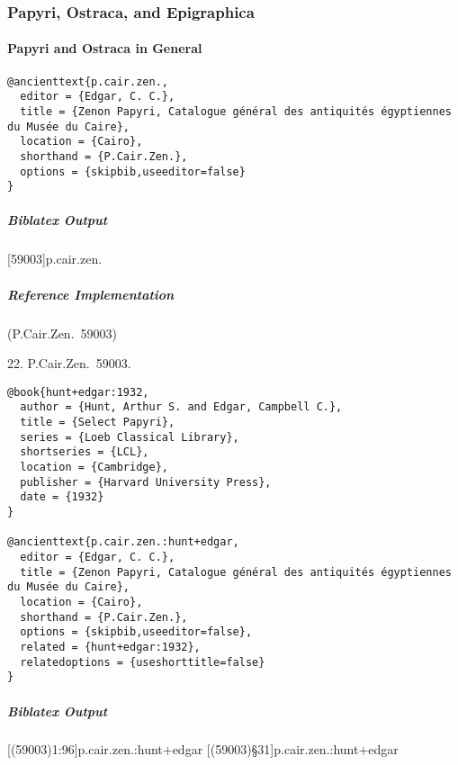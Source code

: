 \documentclass[a4paper]{article}
\newenvironment{biboutput}{%
  \subparagraph{Biblatex Output}
}{\color{black}}
\newenvironment{refimp}{%
  \subparagraph{Reference Implementation}
  \color{reference-colour}
  \rm
}{\par\color{black}}
\begin{document}
\subsubsection{Papyri, Ostraca, and Epigraphica}

\paragraph{Papyri and Ostraca in General}

\begin{lstlisting}
@ancienttext{p.cair.zen.,
  editor = {Edgar, C. C.},
  title = {Zenon Papyri, Catalogue général des antiquités égyptiennes du Musée du Caire},
  location = {Cairo},
  shorthand = {P.Cair.Zen.},
  options = {skipbib,useeditor=false}
}
\end{lstlisting}

\begin{biboutput}
  [59003]{p.cair.zen.}
\end{biboutput}

\begin{refimp}
  (P.Cair.Zen.\ 59003)

  \hspace*{\bibindent}22. P.Cair.Zen.\ 59003.
\end{refimp}

\medskip

\begin{lstlisting}
@book{hunt+edgar:1932,
  author = {Hunt, Arthur S. and Edgar, Campbell C.},
  title = {Select Papyri},
  series = {Loeb Classical Library},
  shortseries = {LCL},
  location = {Cambridge},
  publisher = {Harvard University Press},
  date = {1932}
}

@ancienttext{p.cair.zen.:hunt+edgar,
  editor = {Edgar, C. C.},
  title = {Zenon Papyri, Catalogue général des antiquités égyptiennes du Musée du Caire},
  location = {Cairo},
  shorthand = {P.Cair.Zen.},
  options = {skipbib,useeditor=false},
  related = {hunt+edgar:1932},
  relatedoptions = {useshorttitle=false}
}
\end{lstlisting}

\begin{biboutput}
  [(59003)1:96]{p.cair.zen.:hunt+edgar}
  [(59003)§31]{p.cair.zen.:hunt+edgar}
\end{biboutput}
\end{document}
